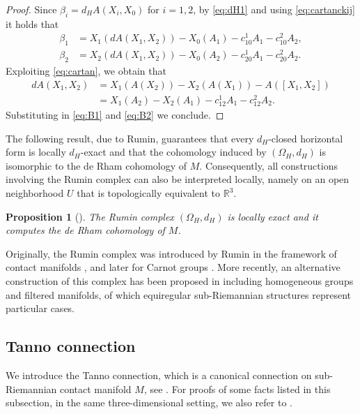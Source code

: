 \documentclass{amsart}
\theoremstyle{plain}
\newtheorem{proposition}[theorem]{Proposition}
\theoremstyle{definition}
\theoremstyle{remark}
\newcommand{\diff}{d}%
\newcommand{\sr}{sub-{R}ie\-man\-nian }
\newcommand{\B}{\beta}
\begin{document}
\begin{proof} 
Since $\B_i=\diff_HA(X_i,X_0)$ for $i=1,2$, by \eqref{eq:dH1} and using \eqref{eq:cartanckij} it holds that
\begin{align}
\beta_1&=X_1(\diff A(X_1,X_2))-X_0(A_1)-c^1_{10}A_1-c^2_{10}A_2, \label{eq:B1}
\\ \beta_2&=X_2(\diff A(X_1,X_2))-X_0(A_2)-c^1_{20}A_1-c^2_{20}A_2.\label{eq:B2}
\end{align} 
Exploiting \eqref{eq:cartan}, we obtain that 
\begin{equation}
\begin{split}
\diff A(X_1,X_2)&=X_1(A(X_2))-X_2(A(X_1))-A([X_1,X_2])
\\&=X_1(A_2)-X_2(A_1)-c^1_{12}A_1-c^2_{12}A_2.
\end{split}
\end{equation}
Substituting in \eqref{eq:B1} and \eqref{eq:B2} we conclude.
\end{proof}

The following result, due to Rumin, guarantees that every $\diff_H$-closed horizontal form is locally $\diff_H$-exact and that the cohomology induced by $(\Omega_H, \diff_H)$ is isomorphic to the de Rham cohomology of $M$. Consequently, all constructions involving the Rumin complex can also be interpreted locally, namely on an open neighborhood $U$ that is topologically equivalent to $\mathbb{R}^3$.  


\begin{proposition}[\cite{RuminContact}]
\label{prop:Rumin}
The Rumin complex $\left(\Omega_H,\diff_H\right)$ is locally exact
and it computes the de Rham cohomology of $M$.
\end{proposition}

Originally, the Rumin complex was introduced by Rumin in the framework of contact manifolds \cites{RuminContact}, and later for Carnot groups \cites{Rum00a}. 
More recently, an alternative construction of this complex has been proposed in \cites{FT23,FT24} including homogeneous groups and filtered manifolds, of which equiregular \sr structures represent particular cases.






\subsection{Tanno connection} \label{s:tanno} 
We introduce the Tanno connection, which is a canonical connection on sub-Riemannian contact manifold $M$, see  \cites{tanno, abrcontact}. For proofs of some facts listed in this subsection, in the same three-dimensional setting, we also refer to \cite{BBCCM}.
\end{document}
